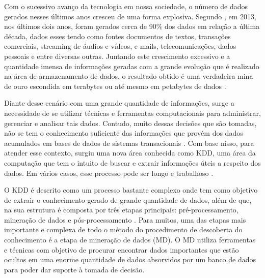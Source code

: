 
\par
Com o sucessivo avanço da tecnologia em nossa sociedade, o número de dados gerados nesses últimos anos cresceu de uma forma explosiva. Segundo , em 2013, nos últimos dois anos, foram gerados cerca de 90\% dos dados em relação a última década, dados esses tendo como fontes documentos de textos, transações comerciais, streaming de áudios e vídeos, e-mails, telecomunicações, dados pessoais e entre diversas outras. Juntando este crescimento excessivo e a quantidade imensa de informações geradas com a grande evolução que é realizado na área de armazenamento de dados, o resultado obtido é uma verdadeira mina de ouro escondida em terabytes ou até mesmo em petabytes de dados \cite{Carvalho2014}. 

\par
Diante desse cenário com uma grande quantidade de informações, surge a necessidade de se utilizar técnicas e ferramentas computacionais para administrar, gerenciar e analisar tais dados. Contudo, muito dessas decisões que são tomadas, não se tem o conhecimento suficiente das informações que provém dos dados acumulados em bases de dados de sistemas transacionais \cite{Rabelo2007}. Com base nisso, para atender esse contexto, surgiu uma nova área conhecida como KDD, uma área da computação que tem o intuito de buscar e extrair informações úteis a respeito dos dados. Em vários casos, esse processo pode ser longo e trabalhoso \cite{Stulp2014}.

\par
 O KDD é descrito como um processo bastante complexo onde tem como objetivo de extrair o conhecimento gerado de grande quantidade de dados, além de que, na sua estrutura é composta por três etapas principais: pré-processamento, mineração de dados e pós-processamento \cite{Rabelo2007}. Para muitos, uma das etapas mais importante e complexa de todo o método do procedimento de descoberta do conhecimento é a etapa de mineração de dados (MD). O MD utiliza ferramentas e técnicas com objetivo de procurar encontrar dados importantes que estão ocultos em uma enorme quantidade de dados absorvidos por um banco de dados para poder dar suporte à tomada de decisão.

